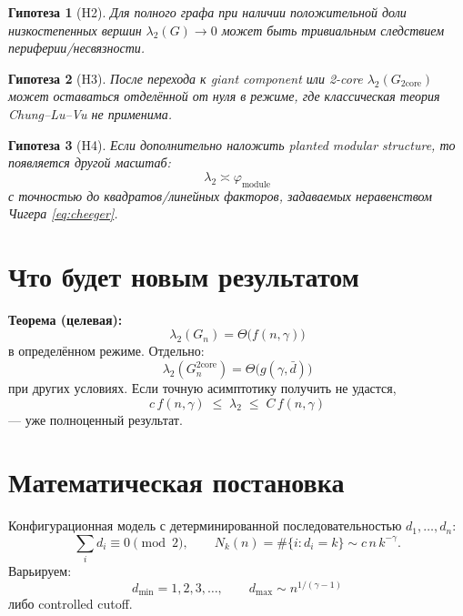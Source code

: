 \documentclass[11pt,a4paper]{article}
\theoremstyle{plain}
\newtheorem{hypothesis}{Гипотеза}
\theoremstyle{definition}
\theoremstyle{remark}
\newcommand{\core}{\mathrm{core}}
\newcommand{\Ph}{\varphi}
\newcommand{\dmin}{d_{\min}}
\newcommand{\dmax}{d_{\max}}
\newcommand{\dbar}{\bar d}
\newcommand{\lamtwo}{\lambda_2}
\newcommand{\Gtwo}{G_{2\core}}
\begin{document}
\begin{hypothesis}[H2]
Для полного графа при наличии положительной доли низкостепенных вершин
$\lamtwo(G)\to 0$ может быть тривиальным следствием периферии/несвязности.
\end{hypothesis}

\begin{hypothesis}[H3]
После перехода к giant component или 2-core $\lamtwo(\Gtwo)$ может оставаться
отделённой от нуля в режиме, где классическая теория Chung--Lu--Vu
\cite{ChungLuVu2003} не применима.
\end{hypothesis}

\begin{hypothesis}[H4]
Если дополнительно наложить planted modular structure, то появляется другой
масштаб:
\begin{equation}
\lamtwo\asymp\Ph_{\mathrm{module}}
\end{equation}
с точностью до квадратов/линейных факторов, задаваемых неравенством Чигера
\eqref{eq:cheeger}.
\end{hypothesis}

\section{Что будет новым результатом}
\label{sec:result}

\textbf{Теорема (целевая):}
\begin{equation}
\lamtwo(G_n)=\Theta\bigl(f(n,\gamma)\bigr)
\end{equation}
в определённом режиме. Отдельно:
\begin{equation}
\lamtwo(G_n^{2\core})=\Theta\bigl(g(\gamma,\dbar)\bigr)
\end{equation}
при других условиях. Если точную асимптотику получить не удастся,
\begin{equation}
c\,f(n,\gamma)\;\le\;\lamtwo\;\le\;C\,f(n,\gamma)
\end{equation}
--- уже полноценный результат.

\section{Математическая постановка}
\label{sec:setup}

Конфигурационная модель \cite{BenderCanfield1978,MolloyReed1995,MolloyReed1998}
с детерминированной последовательностью $d_1,\dots,d_n$:
\begin{equation}
\sum_i d_i\equiv 0 \pmod 2,\qquad
N_k(n)=\#\{i:d_i=k\}\sim c\,n\,k^{-\gamma}.
\end{equation}
Варьируем:
\begin{equation}
\dmin=1,2,3,\dots,\qquad
\dmax\sim n^{1/(\gamma-1)}
\end{equation}
либо controlled cutoff.
\end{document}
